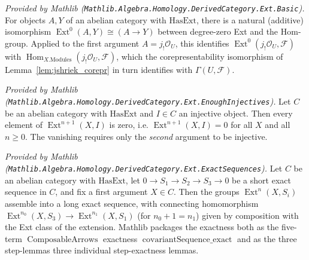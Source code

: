 \begin{lemma}
  \label{lem:ext_homequiv_zero_mathlib}
  \mathlibok
  \textit{Provided by Mathlib
  (\texttt{Mathlib.Algebra.Homology.DerivedCategory.Ext.Basic}).}
  For objects \(A, Y\) of an abelian category with \(\mathrm{HasExt}\), there is a
  natural (additive) isomorphism \(\operatorname{Ext}^0(A, Y) \cong (A \to Y)\) between
  degree-zero Ext and the Hom-group. Applied to the first argument \(A =
  j_!\mathcal{O}_U\), this identifies \(\operatorname{Ext}^0(j_!\mathcal{O}_U,
  \mathcal{F})\) with
  \(\operatorname{Hom}_{X.\mathrm{Modules}}(j_!\mathcal{O}_U, \mathcal{F})\), which the
  corepresentability isomorphism of Lemma~\ref{lem:jshriek_corepr} in turn identifies
  with \(\Gamma(U, \mathcal{F})\).
\end{lemma}

\begin{lemma}
  \label{lem:ext_eq_zero_of_injective_mathlib}
  \mathlibok
  \textit{Provided by Mathlib
  (\texttt{Mathlib.Algebra.Homology.DerivedCategory.Ext.EnoughInjectives}).}
  Let \(C\) be an abelian category with \(\mathrm{HasExt}\) and \(I \in C\) an injective
  object. Then every element of \(\operatorname{Ext}^{n+1}(X, I)\) is zero, i.e.
  \(\operatorname{Ext}^{n+1}(X, I) = 0\) for all \(X\) and all \(n \geq 0\). The
  vanishing requires only the \emph{second} argument to be injective.
\end{lemma}

\begin{lemma}
  \label{lem:ext_covariant_les_mathlib}
  \mathlibok
  \textit{Provided by Mathlib
  (\texttt{Mathlib.Algebra.Homology.DerivedCategory.Ext.ExactSequences}).}
  Let \(C\) be an abelian category with \(\mathrm{HasExt}\), let \(0 \to S_1 \to S_2 \to
  S_3 \to 0\) be a short exact sequence in \(C\), and fix a first argument \(X \in C\).
  Then the groups \(\operatorname{Ext}^n(X, S_i)\) assemble into a long exact sequence,
  with connecting homomorphism \(\operatorname{Ext}^{n_0}(X, S_3) \to
  \operatorname{Ext}^{n_1}(X, S_1)\) (for \(n_0 + 1 = n_1\)) given by composition with
  the Ext class of the extension. Mathlib packages the exactness both as the
  five-term \(\operatorname{ComposableArrows}\) exactness
  \(\operatorname{covariantSequence\_exact}\) and as the three step-lemmas
  three individual step-exactness lemmas.
\end{lemma}

